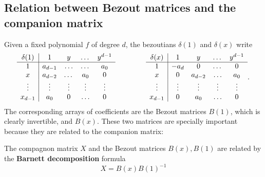\documentclass{standalone}
\begin{document}
\subsection{Relation between Bezout matrices and the companion matrix}
\label{Bar}
Given a fixed polynomial $f$ of degree $d$, the bezoutians $\delta(1)$ and $\delta(x)$ write
\begin{equation}
	\begin{array}{c|cccc}
		\delta(1) & 1 & y & \dots & y^{d-1} \\
		\hline
		1 & a_{d-1} & \ldots & \dots & a_0 \\
		x & a_{d-2} & \dots & a_0 & 0 \\
		\vdots & \vdots & \vdots & \vdots & \vdots \\
		x_{d-1} & a_0 & 0 & \ldots & 0 \\
	\end{array}
	\hspace{1.5cm}
	\begin{array}{c|cccc}
		\delta(x) & 1 & y & \dots & y^{d-1} \\
		\hline
		1 & -a_{d} & 0 & \dots & 0 \\
		x & 0 & a_{d-2} & \ldots & a_0 \\
		\vdots & \vdots & \vdots & \vdots & \vdots \\
		x_{d-1} & 0 & a_0 & \ldots & 0 \\
	\end{array}.
\end{equation}
The corresponding arrays of coefficients are the Bezout matrices $B(1)$, which is clearly invertible, and $B(x)$. 
These two matrices are specially important because they are related to the companion matrix:
\begin{prop}
\label{Barnett}
The compagnon matrix $X$ and the Bezout matrices $B(x), B(1)$ are related by the {\bf Barnett decomposition} formula
\cite{Barnett}
\begin{equation}
	X = B(x)B(1)^{-1}
\end{equation}
\end{prop}
\end{document}
